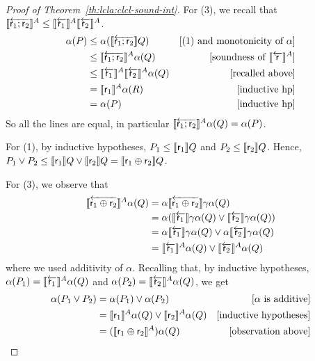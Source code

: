 \begin{proof}[Proof of Theorem~\ref{th:lcla:clcl-sound-int}]
	\noindent For (3), we recall that $\llbracket\overleftarrow{\mathsf{r}_1; \mathsf{r}_2}\rrbracket^{A} \le \llbracket\overleftarrow{\mathsf{r}_1}\rrbracket^{A} \llbracket\overleftarrow{\mathsf{r}_2}\rrbracket^{A}$.
	\begin{align*}
		\alpha(P) & \le \alpha(\llbracket\overleftarrow{\mathsf{r}_1; \mathsf{r}_2}\rrbracket Q)                & [\text{(1) and monotonicity of }\alpha] \\
		          & \le \llbracket\overleftarrow{\mathsf{r}_1; \mathsf{r}_2}\rrbracket^{A} \alpha(Q)            & [\text{soundness of }\llbracket\overleftarrow{\mathsf{r}}\rrbracket^{A}] \\
		          & \le \llbracket\overleftarrow{\mathsf{r}_1}\rrbracket^{A} \llbracket\overleftarrow{\mathsf{r}_2}\rrbracket^{A} \alpha(Q) & [\text{recalled above}]                 \\
		          & = \llbracket\mathsf{r}_1\rrbracket^{A} \alpha(R)                       & [\text{inductive hp}]                   \\
		          & = \alpha(P)                                           & [\text{inductive hp}]
	\end{align*}
	So all the lines are equal, in particular $\llbracket\overleftarrow{\mathsf{r}_1; \mathsf{r}_2}\rrbracket^{A} \alpha(Q) = \alpha(P)$.

	For (1), by inductive hypotheses, $P_1 \le \llbracket\mathsf{r}_1\rrbracket Q$ and $P_2 \le \llbracket\mathsf{r}_2\rrbracket Q$. Hence, $P_1 \lor P_2 \le \llbracket\mathsf{r}_1\rrbracket Q \lor \llbracket\mathsf{r}_2\rrbracket Q = \llbracket\mathsf{r}_1 \oplus \mathsf{r}_2\rrbracket Q$.

	\noindent For (3), we observe that
	\begin{align*}
		\llbracket\overleftarrow{\mathsf{r}_1 \oplus \mathsf{r}_2}\rrbracket^{A} \alpha(Q) & = \alpha \llbracket\overleftarrow{\mathsf{r}_1 \oplus \mathsf{r}_2}\rrbracket \gamma \alpha(Q)                               \\
		                                             & = \alpha (\llbracket\overleftarrow{\mathsf{r}_1}\rrbracket \gamma \alpha(Q) \lor \llbracket\overleftarrow{\mathsf{r}_2}\rrbracket \gamma \alpha(Q))      \\
		                                             & = \alpha \llbracket\overleftarrow{\mathsf{r}_1}\rrbracket \gamma \alpha(Q) \lor \alpha \llbracket\overleftarrow{\mathsf{r}_2}\rrbracket \gamma \alpha(Q) \\
		                                             & = \llbracket\overleftarrow{\mathsf{r}_1}\rrbracket^{A}\alpha(Q) \lor \llbracket\overleftarrow{\mathsf{r}_2}\rrbracket^{A} \alpha(Q)
	\end{align*}
	where we used additivity of $\alpha$.
	Recalling that, by inductive hypotheses, $\alpha(P_1) = \llbracket\overleftarrow{\mathsf{r}_1}\rrbracket^{A} \alpha(Q)$ and $\alpha(P_2) = \llbracket\overleftarrow{\mathsf{r}_2}\rrbracket^{A} \alpha(Q)$, we get
	\begin{align*}
		\alpha(P_1 \lor P_2) & = \alpha(P_1) \lor \alpha(P_2)                                     & [\alpha\text{ is additive}]   \\
		                     & = \llbracket\mathsf{r}_1\rrbracket^{A} \alpha(Q) \lor \llbracket\mathsf{r}_2\rrbracket^{A} \alpha(Q) & [\text{inductive hypotheses}] \\
		                     & = (\llbracket\mathsf{r}_1 \oplus \mathsf{r}_2\rrbracket^{A}) \alpha(Q)                   & [\text{observation above}]
	\end{align*}


\end{proof}
